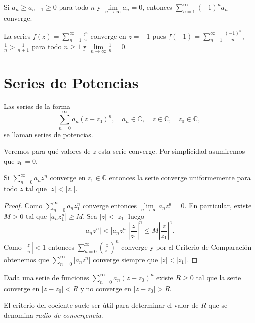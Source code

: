 \begin{teorema}{}
Si $a_n\geq a_{n+1}\geq 0$ para todo $n$ y $\lim\limits_{n \to \infty} a_n=0$, entonces
$\sum\limits_{n=1}^{\infty}(-1)^n a_n$ converge.
\end{teorema}

\begin{ejemplo}{}
La series $f(z)=\sum\limits_{n=1}^{\infty}\frac{z^n}{n}$ converge en $z=-1$ pues 
$f(-1)=\sum\limits_{n=1}^{\infty} \frac{(-1)^n}{n}$, $\frac{1}{n}>\frac{1}{n+1}$ para todo $n\geq 1$ y $\lim\limits_{n \to \infty} \frac{1}{n}=0$.
\end{ejemplo}


\section{Series de Potencias}

Las series de la forma 
\[
\sum\limits_{n=0}^{\infty} a_n (z-z_0)^n,\quad a_n\in \mathbb{C},\quad z\in \mathbb{C},\quad z_0 \in \mathbb{C},
\]
se llaman series de potencias.

Veremos para qué valores de $z$ esta serie converge.
Por simplicidad asumiremos que $z_0=0$.

\begin{lema}{}
Si $\sum\limits_{n=0}^{\infty} a_n z^n$ converge en $z_1\in \mathbb{C}$ entonces 
la serie converge uniformemente para todo $z$ tal que $|z|<|z_1|$.
\end{lema}

\begin{proof}
Como $\sum\limits_{n=0}^{\infty} a_nz_1^n$ converge entonces $\lim\limits_{n\to \infty} a_nz_1^n=0$.
En particular, existe $M>0$ tal que $|a_nz_1^n|\geq M$.
Sea $|z|<|z_1|$ luego
\[|a_n z^n|<|a_n z_1^n|\left|\frac{z}{z_1}\right|^n\leq M \left|\frac{z}{z_1}\right|^n. \]
Como $|\frac{z}{z_1}|<1$ entonces $\sum\limits_{n=0}^{\infty} (\frac{z}{z_1})^n$ converge y por el 
Criterio de Comparación obtenemos que $\sum\limits_{n=0}^{\infty} |a_nz^n|$ converge siempre que 
$|z|<|z_1|$.
\end{proof}

\begin{corolario}{}
Dada una serie de funciones $\sum\limits_{n=0}^{\infty} a_n (z-z_0)^n$ existe $R\geq 0$ tal que la serie
converge en $|z-z_0|<R$ y no converge en $|z-z_0|>R$. 
\end{corolario}

El criterio del cociente suele ser útil para determinar el valor de $R$ que se denomina \emph{radio de convergencia}.

